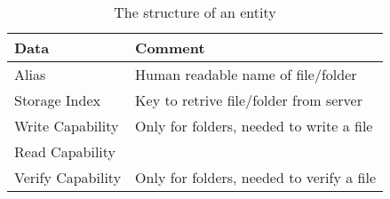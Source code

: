\begin{table}
  \centering
  \caption{The structure of an entity}
  \begin{tabular}{ | l | l |}
    \hline
    \textbf{Data}       & \textbf{Comment}                          \\ \hline
     Alias              & Human readable name of file/folder        \\ \hline
     Storage Index      & Key to retrive file/folder from server    \\ \hline
     Write Capability   & Only for folders, needed to write a file  \\ \hline
     Read Capability    &                                           \\ \hline
     Verify Capability  & Only for folders, needed to verify a file  \\ \hline
  \end{tabular}
  \label{tbl:folder:contents}
\end{table}
